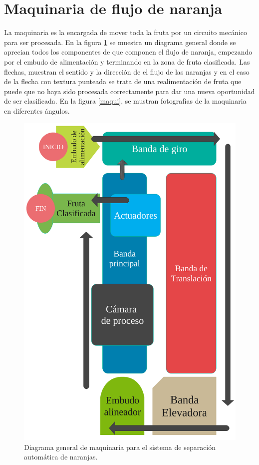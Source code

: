 \documentclass[twoside,spanish,ESP,MSc]{plantillaLabUPV}
\theoremstyle{definition}
\begin{document}
\section{Maquinaria de flujo de naranja}
La maquinaria es la encargada de mover toda la fruta por un circuito mecánico para ser procesada. En la figura \ref{fig:diagramamaquina} se muestra un diagrama general donde se aprecian todos los componentes de que componen el flujo de naranja, empezando por el embudo de alimentación y terminando en la zona de fruta clasificada. Las flechas, muestran el sentido y la dirección de el flujo de las naranjas y en el caso de la flecha con textura punteada se trata de una realimentación de fruta que puede que no haya sido procesada correctamente para dar una nueva oportunidad de ser clasificada. En la figura \ref{maqui}, se mustran fotografías de la maquinaria en diferentes ángulos.

\begin{figure}[!tbh]
	\centering
	\includegraphics[width=0.5\textheight]{edrawimas/diagramamaquina}
	\caption{Diagrama general de maquinaria para el sistema de separación automática de naranjas.}
	\label{fig:diagramamaquina}
\end{figure}
\end{document}
